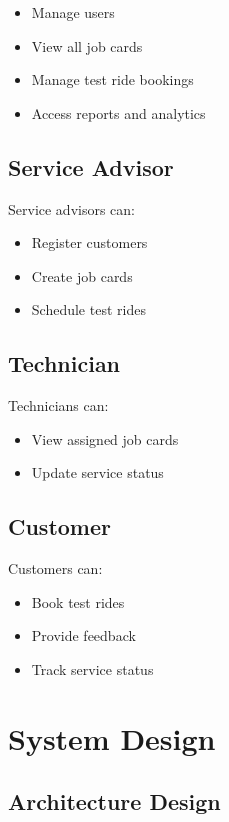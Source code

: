 \documentclass[12pt,a4paper]{report}
\begin{document}
\begin{itemize}
\item Manage users
\item View all job cards
\item Manage test ride bookings
\item Access reports and analytics
\end{itemize}

\section{Service Advisor}

Service advisors can:

\begin{itemize}
\item Register customers
\item Create job cards
\item Schedule test rides
\end{itemize}

\section{Technician}

Technicians can:

\begin{itemize}
\item View assigned job cards
\item Update service status
\end{itemize}

\section{Customer}

Customers can:

\begin{itemize}
\item Book test rides
\item Provide feedback
\item Track service status
\end{itemize}

\chapter{System Design}

\section{Architecture Design}
\end{document}
